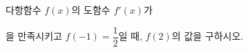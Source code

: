 다항함수 $f(x)$의 도함수 $f'(x)$가 \par\smallskip{}\par\smallskip\noindent 을 만족시키고 $f(-1)=\dfrac{1}{2}$일 때, $f(2)$의 값을 구하시오.
